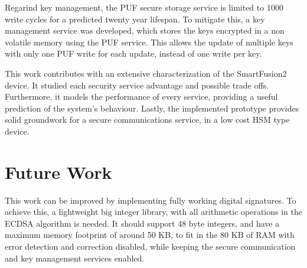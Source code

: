 Regarind key management, the PUF secure storage service is limited to 1000 write cycles for a predicted twenty year lifespan. To mitigate this, a key management service was developed, which stores the keys encrypted in a non volatile memory using the PUF service. This allows the update of multiple keys with only one PUF write for each update, instead of one write per key.

This work contributes with an extensive characterization of the SmartFusion2 device. It studied each security service advantage and possible trade offs. Furthermore, it models the performance of every service, providing a useful prediction of the system's behaviour. Lastly, the implemented prototype provides solid groundwork for a secure communications service, in a low cost HSM type device.

\section{Future Work} \label{chap:conclusion:future-work}

This work can be improved by implementing fully working digital signatures. To achieve this, a lightweight big integer library, with all arithmetic operations in the ECDSA algorithm is needed. It should support 48 byte integers, and have a maximum memory footprint of around 50 KB, to fit in the 80 KB of RAM with error detection and correction disabled, while keeping the secure communication and key management services enabled.
